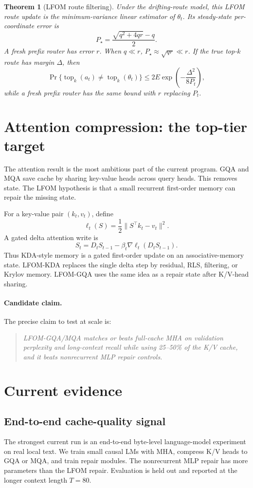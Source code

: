 \documentclass[10pt,twocolumn]{article}
\newtheorem{theorem}{Theorem}
\newcommand{\topk}{\operatorname{top}_k}
\begin{document}
\begin{theorem}[LFOM route filtering]
Under the drifting-route model, this LFOM route update is the minimum-variance linear estimator of $\theta_t$. Its steady-state per-coordinate error is
\[
P_\star=\frac{\sqrt{q^2+4qr}-q}{2}.
\]
A fresh prefix router has error $r$. When $q\ll r$, $P_\star\approx\sqrt{qr}\ll r$. If the true top-$k$ route has margin $\Delta$, then
\[
\Pr\{\topk(a_t)\ne\topk(\theta_t)\}
\le 2E\exp\left(-\frac{\Delta^2}{8P_t}\right),
\]
while a fresh prefix router has the same bound with $r$ replacing $P_t$.
\end{theorem}

\section{Attention compression: the top-tier target}
The attention result is the most ambitious part of the current program. GQA and MQA save cache by sharing key-value heads across query heads. This removes state. The LFOM hypothesis is that a small recurrent first-order memory can repair the missing state.

For a key-value pair $(k_t,v_t)$, define
\[
   \ell_t(S)=\frac12\|S^\top k_t-v_t\|^2.
\]
A gated delta attention write is
\begin{equation}
   S_t=D_tS_{t-1}-\beta_t\nabla\ell_t(D_tS_{t-1}). \label{eq:kda}
\end{equation}
Thus KDA-style memory is a gated first-order update on an associative-memory state. LFOM-KDA replaces the single delta step by residual, RLS, filtering, or Krylov memory. LFOM-GQA uses the same idea as a repair state after K/V-head sharing.

\paragraph{Candidate claim.}
The precise claim to test at scale is:
\begin{quote}
\emph{LFOM-GQA/MQA matches or beats full-cache MHA on validation perplexity and long-context recall while using 25--50\% of the K/V cache, and it beats nonrecurrent MLP repair controls.}
\end{quote}

\section{Current evidence}
\subsection{End-to-end cache-quality signal}
The strongest current run is an end-to-end byte-level language-model experiment on real local text. We train small causal LMs with MHA, compress K/V heads to GQA or MQA, and train repair modules. The nonrecurrent MLP repair has more parameters than the LFOM repair. Evaluation is held out and reported at the longer context length $T=80$.
\end{document}
